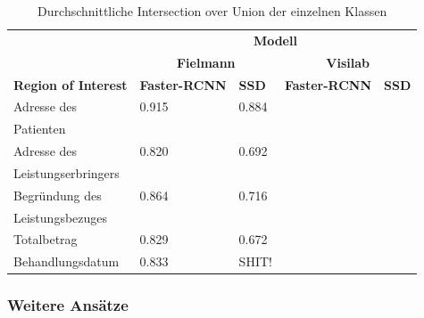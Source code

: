 \begin{table}[h!]
    \centering
    \captionsetup{width=.9\linewidth}
    \caption{Durchschnittliche Intersection over Union der einzelnen Klassen}
    \label{tab:specific-ie-iou}
    \begin{tabular}{|l|l|l|l|l|}
    \hhline{~|----|}    
    \multicolumn{1}{c|}{}
                                    & \multicolumn{4}{c|}{\cellcolor[HTML]{DDDDDD}\textbf{Modell}}  \\
    \hhline{~|--|--|}
    \multicolumn{1}{c|}{}
                                    & \multicolumn{2}{c|}{\cellcolor[HTML]{DDDDDD}\textbf{Fielmann}} 
                                                            & \multicolumn{2}{c|}{\cellcolor[HTML]{DDDDDD}\textbf{Visilab}} \\
    \hline
    \rowcolor[HTML]{DDDDDD}     
    \textbf{Region of Interest}     & \textbf{Faster-RCNN}  & \textbf{SSD}        & \textbf{Faster-RCNN}  & \textbf{SSD} \\
    \hline
    Adresse des                     & 0.915    & 0.884      & & \\
    Patienten &&&& \\
    \hline
    Adresse des                     & 0.820    & 0.692      & & \\
    Leistungserbringers &&&& \\
    \hline
    Begründung des                  & 0.864    & 0.716      & & \\
    Leistungsbezuges &&&& \\
    \hline
    Totalbetrag                     & 0.829    & 0.672      & & \\
    \hline
    Behandlungsdatum                & 0.833    & SHIT!      & & \\
    \hline
    \end{tabular}
\end{table}


\subsubsection{Weitere Ansätze}


